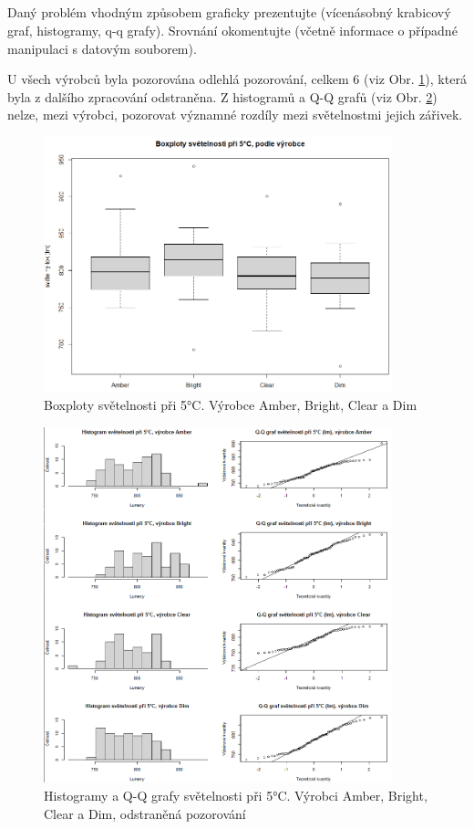 \documentclass[czech]{article}%
\begin{document}
\subsection{}
Daný problém vhodným způsobem graficky prezentujte (vícenásobný krabicový graf, histogramy, q-q grafy). 
Srovnání okomentujte (včetně informace o případné manipulaci s datovým souborem).

U všech výrobců byla pozorována odlehlá pozorování, celkem 6 (viz Obr. \ref{fig:Boxplot3}), která byla z dalšího zpracování odstraněna.
Z histogramů a Q-Q grafů (viz Obr. \ref{fig:QQaHist_3}) nelze, mezi výrobci, pozorovat významné rozdíly mezi světelnostmi jejich zářivek.

\begin{figure}[H]
	\centering
	\includegraphics[width=0.9\textwidth]{Figures/Boxploty_3.png}
	\caption{Boxploty světelnosti při 5°C. Výrobce Amber, Bright, Clear a Dim}
	\label{fig:Boxplot3}
\end{figure}


\begin{figure}[H]
	\centering
	\includegraphics[width=0.9\textwidth]{Figures/QQaHistogram_3.png}
	\caption{Histogramy a Q-Q grafy světelnosti při 5°C. Výrobci Amber, Bright, Clear a Dim, odstraněná pozorování}
	\label{fig:QQaHist_3}
\end{figure}
\end{document}
